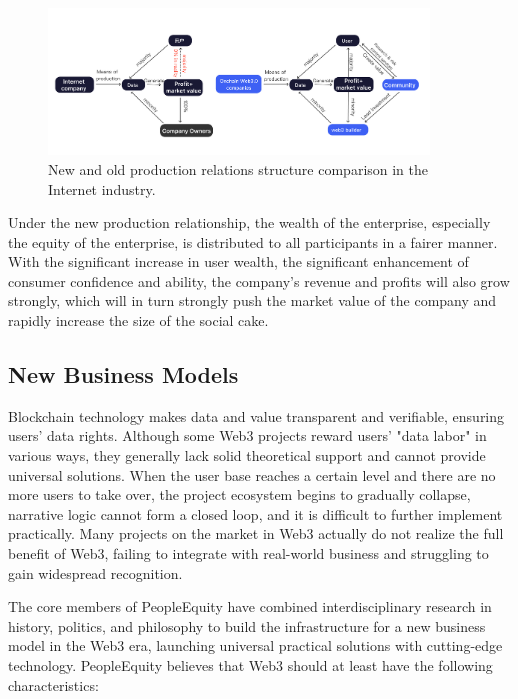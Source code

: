 \documentclass{article}
\begin{document}

\begin{figure}
\centering
\includegraphics[width=0.9\textwidth]{./img/comparation_production_relation_structure.png}
\caption{\label{fig}New and old production relations structure comparison in the Internet industry.}
\end{figure}

Under the new production relationship, the wealth of the enterprise, especially the equity of the enterprise, is distributed to all participants in a fairer manner. With the significant increase in user wealth, the significant enhancement of consumer confidence and ability, the company's revenue and profits will also grow strongly, which will in turn strongly push the market value of the company and rapidly increase the size of the social cake.


\subsection{New Business Models}

Blockchain technology makes data and value transparent and verifiable, ensuring users' data rights. Although some Web3 projects reward users' "data labor" in various ways, they generally lack solid theoretical support and cannot provide universal solutions. When the user base reaches a certain level and there are no more users to take over, the project ecosystem begins to gradually collapse, narrative logic cannot form a closed loop, and it is difficult to further implement practically. Many projects on the market in Web3 actually do not realize the full benefit of Web3, failing to integrate with real-world business and struggling to gain widespread recognition.

The core members of PeopleEquity have combined interdisciplinary research in history, politics, and philosophy to build the infrastructure for a new business model in the Web3 era, launching universal practical solutions with cutting-edge technology. PeopleEquity believes that Web3 should at least have the following characteristics:
\end{document}
